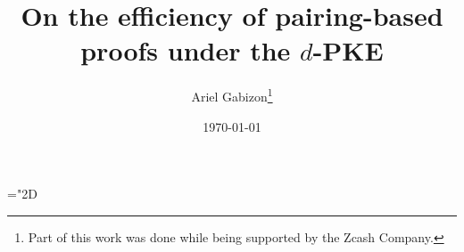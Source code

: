 \documentclass[11pt]{article}
\title{%
On the efficiency of pairing-based proofs under the $d$-PKE}
\date{\today}
\author{Ariel Gabizon\thanks{Part of this work was done while being supported by the Zcash Company.}}
\date{}
\numberwithin{figure}{section} %
\newcommand{\set}[1]{\ensuremath{\left\{#1\right\}}\xspace}
\begin{document}
\maketitle
 \mathchardef\mhyphen="2D

\newcommand{\G}{\ensuremath{{\mathbb G}}\xspace}
\newcommand{\Gstar}{\ensuremath{{\mathbb G}^*}\xspace}

\newcommand{\grouppair}{\ensuremath{G^*}\xspace}

\newcommand{\Gt}{\ensuremath{{\mathbb G}_t}\xspace}
\newcommand{\F}{\ensuremath{\mathbb F}\xspace}
\newcommand{\Fstar}{\ensuremath{\mathbb F^*}\xspace}

\newcommand{\help}[1]{$#1$-helper\xspace}
\newcommand{\randompair}[1]{\ensuremath{\mathsf{randomPair}(#1)}\xspace}
\newcommand{\pair}[1]{$#1$-pair\xspace}
\newcommand{\pairs}[1]{$#1$-pairs\xspace}

\newcommand{\pairone}[1]{\G1-$#1$-pair\xspace}
\newcommand{\pairtwo}[1]{\G2-$#1$-pair\xspace}
\newcommand{\sameratio}[2]{\ensuremath{\mathsf{SameRatio}(#1,#2)}\xspace}
\newcommand{\vecc}[2]{\ensuremath{(#1)_{#2}}\xspace}
\newcommand{\players}{\ensuremath{[n]}\xspace}
\newcommand{\adv}{\ensuremath{\mathcal A}\xspace}
\newcommand{\advprime}{\ensuremath{A'}\xspace}
\newcommand{\extprime}{\ensuremath{E'}\xspace}
\newcommand{\advrand}{\ensuremath{\mathsf{rand}_{\adv}}\xspace}

\newcommand{\ci}{\ensuremath{\mathrm{CI}}\xspace}
\newcommand{\pairvec}[1]{$#1$-vector\xspace}
\newcommand{\Fq}{\ensuremath{\mathbb{F}_q}\xspace}
\newcommand{\randpair}[1]{\ensuremath{\mathsf{rp}_{#1}}\xspace}
\newcommand{\randpairone}[1]{\ensuremath{\mathsf{rp}_{#1}^{1}}\xspace}
\newcommand{\abase}{\ensuremath{A_{\mathrm{\mathbf{0}}}}\xspace}
\newcommand{\bbase}{\ensuremath{B_{\mathrm{\mathbf{0}}}}\xspace}
\newcommand{\cbase}{\ensuremath{C_{\mathrm{\mathbf{0}}}}\xspace}

\newcommand{\amid}{\ensuremath{A_{\mathrm{mid}}}\xspace}
\newcommand{\bmid}{\ensuremath{B_{\mathrm{mid}}}\xspace}
\newcommand{\cmid}{\ensuremath{C_{\mathrm{mid}}}\xspace}

\newcommand{\negl}{\ensuremath{\mathsf{negl}(\lambda)}\xspace}
\newcommand{\randpairtwo}[1]{\ensuremath{\mathsf{rp_{#1}^2}}\xspace}%
\newcommand{\nilp}{\ensuremath{\mathscr N}\xspace}
\newcommand{\snark}{\ensuremath{\mathscr S}\xspace}
\newcommand{\groupgen}{\ensuremath{\mathscr G}\xspace}
\newcommand{\qap}{\ensuremath{\mathscr Q}\xspace}
\end{document}
